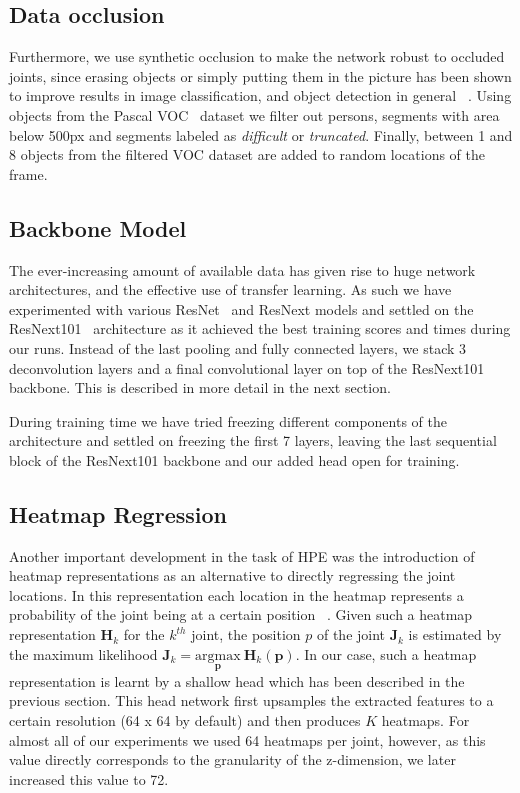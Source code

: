 \subsection{Data occlusion}

Furthermore, we use synthetic occlusion to make the network robust to occluded joints,
since erasing objects or simply putting them in the picture
has been shown to improve results in image classification, and object detection in general
~\cite{sarandi_synthetic_2018}.
Using objects from the Pascal VOC~\cite{Everingham2009ThePV} dataset we filter out persons,
segments with area below 500px and segments labeled as \emph{difficult} or \emph{truncated}.
Finally, between 1 and 8 objects from the filtered VOC dataset are added to random locations of the frame.

\subsection{Backbone Model}
The ever-increasing amount of available data has given rise to huge network architectures, and the effective
use of transfer learning.
As such we have experimented with various ResNet~\cite{DBLP:journals/corr/HeZRS15} and ResNext models and settled on
the ResNext101~\cite{DBLP:journals/corr/XieGDTH16} architecture as it achieved the best training scores and times during our runs.
Instead of the last pooling and fully connected layers, we stack 3 deconvolution
layers and a final convolutional layer on top of the ResNext101 backbone.
This is described in more detail in the next section.

During training time we have tried freezing different components of the architecture and settled on
freezing the first 7 layers, leaving the last sequential block of the ResNext101 backbone and our added head open for training.

\subsection{Heatmap Regression}

Another important development in the task of HPE was the introduction of heatmap representations as an alternative to directly regressing the joint locations.
In this representation each location in the heatmap represents a probability of the joint
being at a certain position ~\cite{sun_integral_2018-1}.
Given such a heatmap representation $\mathbf{H}_k$ for the $k^{th}$ joint,
the position $p$ of the joint $\mathbf{J}_k$ is estimated by the maximum likelihood
$\mathbf{J}_k=\underset{\mathbf{p}}{\text{argmax}}\ \mathbf{H}_k(\mathbf{p})$.
In our case, such a heatmap representation is learnt by a shallow head which has been described in the previous section.
This head network first upsamples the extracted features to a certain resolution (64 x 64 by default) and then produces $K$ heatmaps.
For almost all of our experiments we used 64 heatmaps per joint, however, as this value directly corresponds to the granularity of the z-dimension, we later increased this value to 72.

